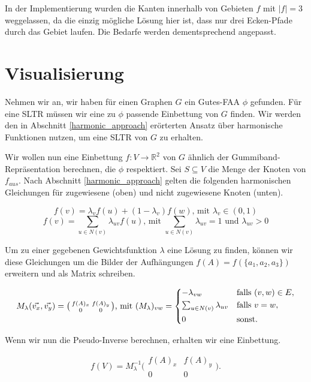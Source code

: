 \begin{remark}
In der Implementierung wurden die Kanten innerhalb von Gebieten $f$ mit $|f|=3$ weggelassen, da die einzig mögliche Lösung hier ist, dass nur drei Ecken-Pfade durch das Gebiet laufen. Die Bedarfe werden dementsprechend angepasst.
\end{remark}

\section{Visualisierung}

Nehmen wir an, wir haben für einen Graphen $G$ ein Gutes-FAA $\phi$ gefunden. Für eine SLTR müssen wir eine zu $\phi$ passende Einbettung von $G$ finden. Wir werden den in Abschnitt \ref{harmonic_approach} erörterten Ansatz über harmonische Funktionen nutzen, um eine SLTR von $G$ zu erhalten.

Wir wollen nun eine Einbettung $f:V\to \mathbb{R}^2$ von $G$ ähnlich der Gummiband-Repräsentation berechnen, die $\phi$ respektiert. Sei $S \subseteq V$ die Menge der Knoten von $f_{aus}$. Nach Abschnitt \ref{harmonic_approach} gelten die folgenden harmonischen Gleichungen für zugewiesene (oben) und nicht zugewiesene Knoten (unten).

$$ f(v) = \lambda_v f(u) + (1-\lambda_v)f(w) \text{, mit } \lambda_v \in (0,1) $$
$$ f(v) = \sum_{u \in N(v)} \lambda_{uv} f(u) \text{, mit }  \sum_{u \in N(v)}\lambda_{uv} = 1 \text{ und } \lambda_{uv} > 0 $$

Um zu einer gegebenen Gewichtsfunktion $\lambda$ eine Lösung zu finden, können wir diese Gleichungen um die Bilder der Aufhängungen $f(A) = f(\{a_1,a_2,a_3\})$ erweitern und als Matrix schreiben.

\[ M_{\lambda}(\vec{v_x},\vec{v_y}) = \big( \begin{smallmatrix}f(A)_x&f(A)_y\\ 0&0\end{smallmatrix} \big) \text{, mit } (M_{\lambda})_{vw} =
	\begin{dcases}
	-\lambda_{vw} & \text{falls } (v,w) \in E, \\
	\textstyle\sum_{u \in N(v)} \lambda_{uv} & \text{falls } v = w, \\
	0 & \text{sonst.} \\
	\end{dcases}
\]

Wenn wir nun die Pseudo-Inverse berechnen, erhalten wir eine Einbettung.

$$f(V) = M_{\lambda}^{-1}\big( \begin{smallmatrix}f(A)_x&f(A)_y\\ 0&0\end{smallmatrix} \big).$$

